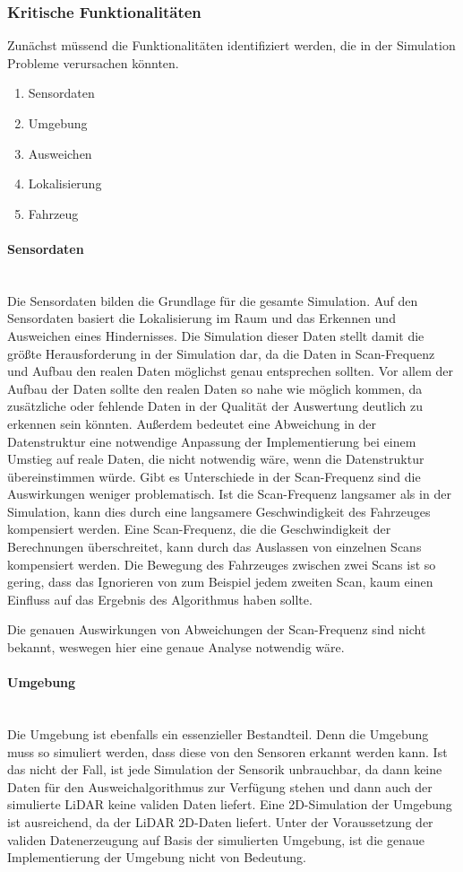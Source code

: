 \subsubsection{Kritische Funktionalitäten}
Zunächst müssend die Funktionalitäten identifiziert werden, die in der Simulation Probleme verursachen könnten.
\begin{enumerate}
    \item Sensordaten
    \item Umgebung 
    \item Ausweichen
    \item Lokalisierung
    \item Fahrzeug
\end{enumerate}

\paragraph{Sensordaten} \mbox{}\\
Die Sensordaten bilden die Grundlage für die gesamte Simulation. 
Auf den Sensordaten basiert die Lokalisierung im Raum und das Erkennen und Ausweichen eines Hindernisses. 
Die Simulation dieser Daten stellt damit die größte Herausforderung in der Simulation dar, 
da die Daten in Scan-Frequenz und Aufbau den realen Daten möglichst genau entsprechen sollten.
Vor allem der Aufbau der Daten sollte den realen Daten so nahe wie möglich kommen, 
da zusätzliche oder fehlende Daten in der Qualität der Auswertung deutlich zu erkennen sein könnten. 
Außerdem bedeutet eine Abweichung in der Datenstruktur eine notwendige Anpassung der Implementierung bei einem Umstieg auf reale Daten, 
die nicht notwendig wäre, wenn die Datenstruktur übereinstimmen würde.
Gibt es Unterschiede in der Scan-Frequenz sind die Auswirkungen weniger problematisch. 
Ist die Scan-Frequenz langsamer als in der Simulation, kann dies durch eine langsamere Geschwindigkeit des Fahrzeuges kompensiert werden.
Eine Scan-Frequenz, die die Geschwindigkeit der Berechnungen überschreitet, kann durch das Auslassen von einzelnen Scans kompensiert werden.
Die Bewegung des Fahrzeuges zwischen zwei Scans ist so gering, dass das Ignorieren von zum Beispiel jedem zweiten Scan,
kaum einen Einfluss auf das Ergebnis des Algorithmus haben sollte. 

Die genauen Auswirkungen von Abweichungen der Scan-Frequenz sind nicht bekannt, weswegen hier eine genaue Analyse notwendig wäre.

\paragraph{Umgebung} \mbox{}\\
Die Umgebung ist ebenfalls ein essenzieller Bestandteil. 
Denn die Umgebung muss so simuliert werden, dass diese von den Sensoren erkannt werden kann. 
Ist das nicht der Fall, ist jede Simulation der Sensorik unbrauchbar, 
da dann keine Daten für den Ausweichalgorithmus zur Verfügung stehen und dann auch der simulierte LiDAR keine validen Daten liefert.
Eine 2D-Simulation der Umgebung ist ausreichend, da der LiDAR 2D-Daten liefert.
Unter der Voraussetzung der validen Datenerzeugung auf Basis der simulierten Umgebung, 
ist die genaue Implementierung der Umgebung nicht von Bedeutung. 


